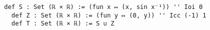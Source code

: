 \begin{lstlisting}[language=lean]
  def S : Set (ℝ × ℝ) := (fun x ↦ (x, sin x⁻¹)) '' Ioi 0
  def Z : Set (ℝ × ℝ) := (fun y ↦ (0, y)) '' Icc (-1) 1
  def T : Set (ℝ × ℝ) := S ∪ Z
\end{lstlisting}



